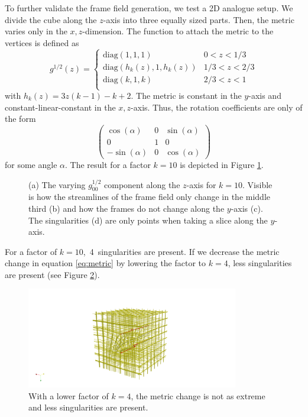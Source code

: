 \documentclass[../thesis.tex]{subfiles}
\begin{document}
To further validate the frame field generation, we test a 2D analogue setup.
We divide the cube along
the $z$-axis into three equally sized parts.
Then, the metric varies only in the $x,z$-dimension.
The function to attach the metric to the vertices is defined as
\begin{equation}\label{eq:metric}
g^{1/2}(z) = \begin{cases}
    \mathrm{diag}(1,1,1) &0 < z < 1/3 \\
    \mathrm{diag}(h_k(z),1,h_k(z)) &1/3 < z < 2/3 \\
    \mathrm{diag}(k,1,k) &2/3 < z < 1 \\
\end{cases}\end{equation}
with $h_k(z)=3z(k-1)-k+2$.
The metric is constant in the $y$-axis and constant-linear-constant in the $x,z$-axis.
Thus, the rotation coefficients are only of the form
$$\begin{pmatrix}
    \cos (\alpha) & 0 & \sin(\alpha) \\
    0 & 1 & 0 \\
    -\sin(\alpha) & 0 & \cos(\alpha)
\end{pmatrix}$$
for some angle $\alpha$.
The result for a factor $k=10$ is depicted in Figure \ref{fig:image2}.
\begin{figure}[htb]
    \centering
    \def\svgwidth{\textwidth}
    
    \caption{(a) The varying $g^{1/2}_{00}$ component along the $z$-axis for $k=10$. Visible is how
    the streamlines of the frame field only change in the middle third (b) and how the frames do not change along the $y$-axis (c).
    The singularities (d) are only points when taking a slice along the $y$-axis.}
    \label{fig:image2}
\end{figure}
For a factor of $k=10$,~4~singularities are present.
If we decrease the metric change in equation \ref{eq:metric} by
lowering the factor to $k=4$, less singularities are present (see Figure \ref{fig:image3}).
\begin{figure}[htb]
    \centering
    \includegraphics[width=25em]{figures/image3}
    \caption{With a lower factor of $k=4$, the metric change is not as extreme and less singularities are present.}
    \label{fig:image3}
\end{figure}
\end{document}
